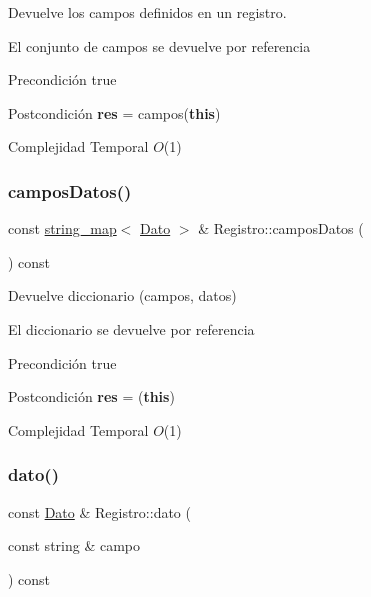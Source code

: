 Devuelve los campos definidos en un registro. 

El conjunto de campos se devuelve por referencia

\begin{DoxyPrecond}{Precondición}
true 
\end{DoxyPrecond}
\begin{DoxyPostcond}{Postcondición}
{\bfseries res} = campos({\bfseries this})
\end{DoxyPostcond}

\begin{DoxyDescription}
\item[Complejidad Temporal]$O$(1)
\end{DoxyDescription}\mbox{\label{classRegistro_af3f9eaec87fdf153f2c98c410bd987be}} 
\subsubsection{\texorpdfstring{campos\+Datos()}{camposDatos()}}
{\footnotesize\ttfamily const \mbox{\hyperlink{classstring__map}{string\+\_\+map}}$<$ \mbox{\hyperlink{classDato}{Dato}} $>$ \& Registro\+::campos\+Datos (\begin{DoxyParamCaption}{ }\end{DoxyParamCaption}) const}



Devuelve diccionario (campos, datos) 

El diccionario se devuelve por referencia

\begin{DoxyPrecond}{Precondición}
true 
\end{DoxyPrecond}
\begin{DoxyPostcond}{Postcondición}
{\bfseries res} = ({\bfseries this})
\end{DoxyPostcond}

\begin{DoxyDescription}
\item[Complejidad Temporal]$O$(1)
\end{DoxyDescription}\mbox{\label{classRegistro_a2b61358029430c966c18c742eda61d1d}} 
\subsubsection{\texorpdfstring{dato()}{dato()}}
{\footnotesize\ttfamily const \mbox{\hyperlink{classDato}{Dato}} \& Registro\+::dato (\begin{DoxyParamCaption}\item[{const string \&}]{campo }\end{DoxyParamCaption}) const}



